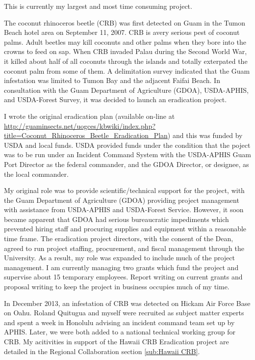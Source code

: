 \documentclass[12pt,oneside,english]{scrbook}
\begin{document}
This is currently my largest and most time consuming project. 

The coconut rhinoceros beetle (CRB) was first detected on Guam in
the Tumon Beach hotel area on September 11, 2007. CRB is avery serious
pest of coconut palms. Adult beetles may kill coconuts and other palms
when they bore into the crowns to feed on sap. When CRB invaded Palau
during the Second World War, it killed about half of all coconuts
through the islands and totally exterpated the coconut palm from some
of them. A delimitation survey indicated that the Guam infestation
was limited to Tumon Bay and the adjacent Faifai Beach. In consultation
with the Guam Department of Agriculture (GDOA), USDA-APHIS, and USDA-Forest
Survey, it was decided to launch an eradication project. 

I wrote the original eradication plan (available on-line at \url{http://guaminsects.net/uogces/kbwiki/index.php?title=Coconut_Rhinoceros_Beetle_Eradication_Plan})
and this was funded by USDA and local funds. USDA provided funds under
the condition that the poject was to be run under an Incident Command
System with the USDA-APHIS Guam Port Director as the federal commander,
and the GDOA Director, or designee, as the local commander.

My original role was to provide scientific/technical support for the
project, with the Guam Department of Agriculture (GDOA) providing
project management with assistance from USDA-APHIS and USDA-Forest
Service. However, it soon became apparent that GDOA had serious bureaucratic
impediments which prevented hiring staff and procuring supplies and
equipment within a reasonable time frame. The eradication project
directors, with the consent of the Dean, agreed to run project staffing,
procurement, and fiscal management through the University. As a result,
my role was expanded to include much of the project management. I
am currently managing two grants which fund the project and supervise
about 15 temporary employees. Report writing on current grants and
proposal writing to keep the project in business occupies much of
my time. 

In December 2013, an infestation of CRB was detected on Hickam Air
Force Base on Oahu. Roland Quitugua and myself were recruited as subject
matter experts and spent a week in Honolulu advising an incident command
team set up by APHIS. Later, we were both added to a national technical
working group for CRB. My acitivities in support of the Hawaii CRB
Eradication project are detailed in the Regional Collaboration section
\ref{sub:Hawaii CRB}. 
\end{document}
